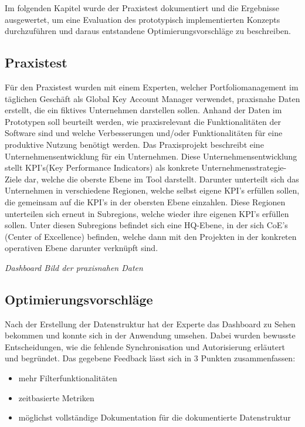 Im folgenden Kapitel wurde der Praxistest dokumentiert und die Ergebnisse ausgewertet, um eine Evaluation des prototypisch implementierten Konzepts durchzuführen und daraus entstandene Optimierungsvorschläge zu beschreiben.
\subsection{Praxistest}
Für den Praxistest wurden mit einem Experten, welcher Portfoliomanagement im täglichen Geschäft als Global Key Account Manager verwendet, praxisnahe Daten erstellt, die ein fiktives Unternehmen darstellen sollen. Anhand der Daten im Prototypen soll beurteilt werden, wie praxisrelevant die Funktionalitäten der Software sind und welche Verbesserungen und/oder Funktionalitäten für eine produktive Nutzung benötigt werden. Das Praxisprojekt beschreibt eine Unternehmensentwicklung für ein Unternehmen. Diese Unternehmensentwicklung stellt KPI's(Key Performance Indicators) als konkrete Unternehmensstrategie-Ziele dar, welche die oberste Ebene im Tool darstellt. Darunter unterteilt sich das Unternehmen in verschiedene Regionen, welche selbst eigene KPI's erfüllen sollen, die gemeinsam auf die KPI's in der obersten Ebene einzahlen. Diese Regionen unterteilen sich erneut in Subregions, welche wieder ihre eigenen KPI's erfüllen sollen. Unter diesen Subregions befindet sich eine HQ-Ebene, in der sich CoE's (Center of Excellence) befinden, welche dann mit den Projekten in der konkreten operativen Ebene darunter verknüpft sind.

\emph{Dashboard Bild der praxisnahen Daten}

\subsection{Optimierungsvorschläge}
Nach der Erstellung der Datenstruktur hat der Experte das Dashboard zu Sehen bekommen und konnte sich in der Anwendung umsehen. Dabei wurden bewusste Entscheidungen, wie die fehlende Synchronisation und Autorisierung erläutert und begründet.
Das gegebene Feedback lässt sich in 3 Punkten zusammenfassen:

\begin{itemize}
    \item mehr Filterfunktionalitäten
    \item zeitbasierte Metriken
    \item möglichst vollständige Dokumentation für die dokumentierte Datenstruktur
\end{itemize}

